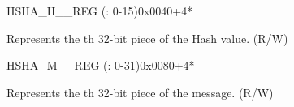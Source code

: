\begin{register}{H}{SHA\_H\_\_REG (: 0-15)}{0x0040+4*}\label{regdesc:SHAHNREG}
%
\regnewline%
\begin{regdesc}\begin{reglist}
\label{fielddesc:SHAH0}\item [SHA\_H\_\regindex{n}] Represents the th 32-bit piece of the Hash value. (R/W)
\end{reglist}\end{regdesc}
\end{register}

\begin{register}{H}{SHA\_M\_\_REG (: 0-31)}{0x0080+4*}\label{regdesc:SHAMNREG}
%
\regnewline%
\begin{regdesc}\begin{reglist}
\label{fielddesc:SHAM0}\item [SHA\_M\_\regindex{n}] Represents the th 32-bit piece of the message. (R/W)
\end{reglist}\end{regdesc}
\end{register}
